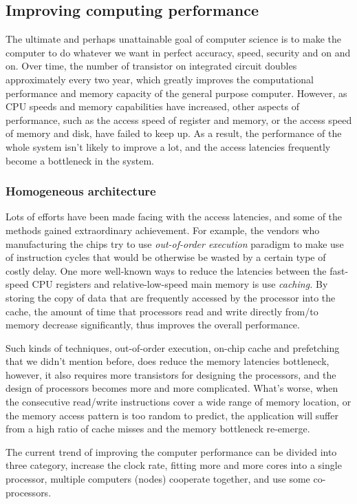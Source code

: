 \subsection{Improving computing performance}
The ultimate and perhaps unattainable goal of computer science is
to make the computer to do whatever we want in perfect accuracy, speed,
security and on and on. Over time, the number of transistor on integrated
circuit doubles approximately every two year, which greatly improves
the computational performance and memory capacity of the general purpose
computer. However, as CPU speeds and memory capabilities have increased,
other aspects of performance, such as the access speed of register
and memory, or the access speed of memory and disk, have failed to
keep up. As a result, the performance of the whole system isn't likely
to improve a lot, and the access latencies frequently become a bottleneck
in the system.

\subsubsection{Homogeneous architecture} %
\label{ssub:Homogeneous architecture}

Lots of efforts have been made facing with the access latencies, and
some of the methods gained extraordinary achievement. For example,
the vendors who manufacturing the chips try to use \emph {out-of-order
execution}  paradigm to make use of instruction cycles that would
be otherwise be wasted by a certain type of costly delay. One more
well-known ways to reduce the latencies between the fast-speed CPU
registers and relative-low-speed main memory is use \emph {caching.}
By storing the copy of data that are frequently accessed by the
processor into the cache, the amount of time that processors read
and write directly from/to memory decrease significantly, thus improves
the overall performance.

Such kinds of techniques, out-of-order execution, on-chip cache and
prefetching that we didn't mention before, does reduce the memory
latencies bottleneck, however, it also requires more transistors for
designing the processors, and the design of processors becomes more
and more complicated. What's worse, when the consecutive read/write
instructions cover a wide range of memory location, or the memory
access pattern is too random to predict, the application will suffer
from a high ratio of cache misses and the memory bottleneck re-emerge\cite{fu11}.

The current trend of improving the computer performance can be divided
into three category, increase the clock rate, fitting more and more
cores into a single processor, multiple computers (nodes) cooperate
together, and use some co-processors.

